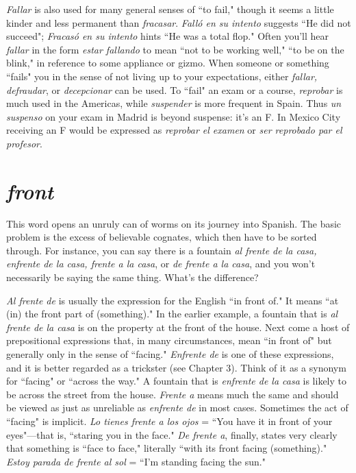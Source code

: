 \emph{Fallar} is also used for many general senses of ``to
fail," though it seems a little kinder and less permanent than \emph{fracasar}.
\emph{Falló en su intento} suggests ``He did not succeed"; \emph{Fracasó en su intento} hints ``He was a total flop." Often you'll hear \emph{fallar} in the form
\emph{estar fallando} to mean ``not to be working well," ``to be on the blink,"
in reference to some appliance or gizmo. When someone or something
``fails" you in the sense of not living up to your expectations, either
\emph{fallar, defraudar}, or \emph{decepcionar} can be used. To ``fail" an exam or a
course, \emph{reprobar} is much used in the Americas, while \emph{suspender} is
more frequent in Spain. Thus \emph{un suspenso} on your exam in Madrid is
beyond suspense: it's an F. In Mexico City receiving an F would be expressed as \emph{reprobar el examen} or \emph{ser reprobado par el profesor}.

\section{\emph{front}}

This word opens an unruly can of worms on its journey into
Spanish. The basic problem is the excess of believable cognates, which
then have to be sorted through. For instance, you can say there is a
fountain \emph{al frente de la casa, enfrente de la casa, frente a la casa}, or
\emph{de frente a la casa}, and you won't necessarily be saying the same
thing. What's the difference?

\emph{Al frente de} is usually the expression for the English ``in front
of." It means ``at (in) the front part of (something)." In the earlier example, a fountain that is \emph{al frente de la casa} is on the property at the
front of the house. Next come a host of prepositional expressions that,
in many circumstances, mean ``in front of" but generally only in the
sense of ``facing." \emph{Enfrente de} is one of these expressions, and it is better regarded as a trickster (see Chapter 3). Think of it as a synonym for
``facing" or ``across the way." A fountain that is \emph{enfrente de la casa} is
likely to be across the street from the house. \emph{Frente a} means much the
same and should be viewed as just as unreliable as \emph{enfrente de} in most
cases. Sometimes the act of ``facing" is implicit. \emph{Lo tienes frente a los
	ojos} = ``You have it in front of your eyes"---that is, ``staring you in the
face." \emph{De frente a}, finally, states very clearly that something is ``face
to face," literally ``with its front facing (something)." \emph{Estoy parada de
	frente al sol} = ``I'm standing facing the sun."

